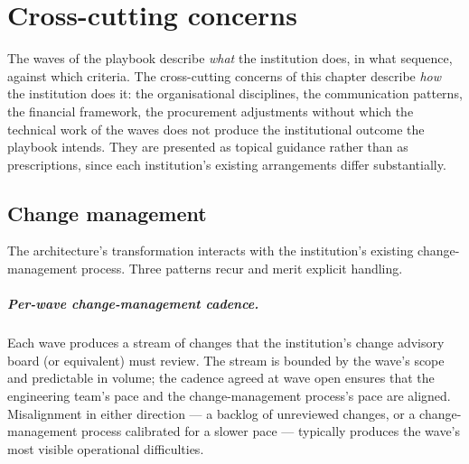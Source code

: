 
\chapter{Cross-cutting concerns}
\label{ch:cross-cutting}

The waves of the playbook describe \emph{what} the institution
does, in what sequence, against which criteria. The cross-cutting
concerns of this chapter describe \emph{how} the institution does
it: the organisational disciplines, the communication patterns,
the financial framework, the procurement adjustments without which
the technical work of the waves does not produce the institutional
outcome the playbook intends. They are presented as topical
guidance rather than as prescriptions, since each institution's
existing arrangements differ substantially.

\section{Change management}
\label{sec:cc-change}

The architecture's transformation interacts with the institution's
existing change-management process. Three patterns recur and merit
explicit handling.

\paragraph{Per-wave change-management cadence.} Each wave produces
a stream of changes that the institution's change advisory board
(or equivalent) must review. The stream is bounded by the wave's
scope and predictable in volume; the cadence agreed at wave open
ensures that the engineering team's pace and the change-management
process's pace are aligned. Misalignment in either direction --- a
backlog of unreviewed changes, or a change-management process
calibrated for a slower pace --- typically produces the wave's
most visible operational difficulties.

